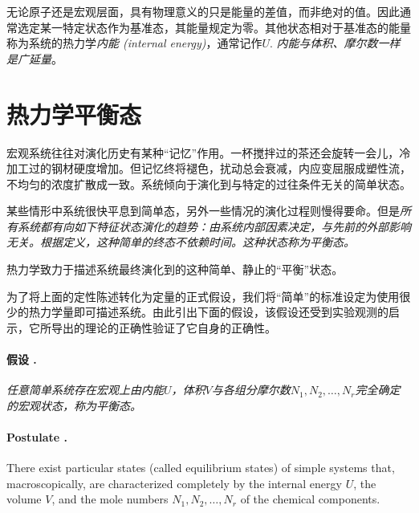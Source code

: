 无论原子还是宏观层面，具有物理意义的只是能量的差值，而非绝对的值。因此通常选定某一特定状态作为基准态，其能量规定为零。其他状态相对于基准态的能量称为系统的热力学{\it 内能 (internal energy)}，通常记作$U$. {\it 内能与体积、摩尔数一样是广延量}。

\section{热力学平衡态}
\label{sec1.5}

宏观系统往往对演化历史有某种“记忆”作用。一杯搅拌过的茶还会旋转一会儿，冷加工过的钢材硬度增加。但记忆终将褪色，扰动总会衰减，内应变屈服成塑性流，不均匀的浓度扩散成一致。系统倾向于演化到与特定的过往条件无关的简单状态。

某些情形中系统很快平息到简单态，另外一些情况的演化过程则慢得要命。但是{\it 所有系统都有向如下特征状态演化的趋势：由系统内部因素决定，与先前的外部影响无关。根据定义，这种简单的终态不依赖时间。这种状态称为平衡态。}

热力学致力于描述系统最终演化到的这种简单、静止的“平衡”状态。

为了将上面的定性陈述转化为定量的正式假设，我们将“简单”的标准设定为使用很少的热力学量即可描述系统。由此引出下面的假设，该假设还受到实验观测的启示，它所导出的理论的正确性验证了它自身的正确性。

\paragraph{假设 \uppercase\expandafter{}.}
{\it 任意简单系统存在宏观上由内能$U$，体积$V$与各组分摩尔数$N_1, N_2, \dots, N_r$完全确定的宏观状态，称为平衡态。}

\paragraph{Postulate \uppercase\expandafter{}.}
There exist particular states (called equilibrium states) of simple systems that, macroscopically, are characterized completely by the internal energy $U$, the volume $V$, and the mole numbers $N_1, N_2, \dots, N_r$ of the chemical components. 

\ 

